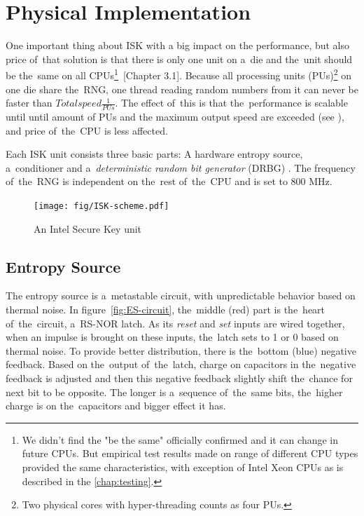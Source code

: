 \section{Physical Implementation}\label{sec:ISK-physical}
\par{
One important thing about ISK with a big impact on the performance, but also price 
of~that solution is that there is only one unit on a~die and the~unit should be
 the~same on all CPUs\footnote{We didn't find the "be the same" officially confirmed and it can change in future CPUs. But empirical test results made on range of different CPU types provided the same characteristics, with exception of Intel Xeon CPUs as is described in the \ref{chap:testing}.}~\cite{IntelDRNGGuide}[Chapter 3.1].
Because all processing units (PUs)\footnote{Two physical cores with 
hyper-threading counts as four PUs.} on one die share the~RNG, one thread 
reading random numbers from it can never be faster than 
$Total speed  \frac{1}{PUs}$. The effect of~this is that the~performance is
 scalable until until amount of PUs and the maximum output speed are exceeded 
 (see ), and price of~the~CPU is less 
 affected.
}

\par{
Each ISK unit consists three basic parts: A hardware entropy source, 
a~conditioner and a~{\em deterministic random bit generator} (DRBG)
\cite{IntelDRNGGuide}. The frequency of~the~RNG is independent 
on the~rest of~the~CPU and is set to 800 MHz. 
}
\begin{figure}[h!]
  \centering
 \texttt{[image: fig/ISK-scheme.pdf]} %
\caption{An Intel Secure Key unit}
\label{fig:ISK-unit}
\end{figure}


\subsection{Entropy Source}
\par{
The entropy source is a~metastable circuit, with unpredictable behavior based 
on thermal noise\cite{UnderstandingRdRandElectronic}. 
In figure~\ref{fig:ES-circuit}, the~middle (red) part is the~heart 
of~the~circuit, a~RS-NOR latch. As its {\em reset} and {\em set} inputs 
are wired together, when an impulse is brought on these inputs, the~latch sets 
to 1 or 0 based on thermal noise. To provide better distribution, there is 
the~bottom (blue) negative feedback. Based on the~output of~the~latch, charge 
on capacitors in the~negative feedback is adjusted and then this negative 
feedback slightly shift the~chance for next bit to be opposite. The longer 
is a~sequence of~the~same bits, the~higher charge is on the~capacitors 
and bigger effect it has.
}

